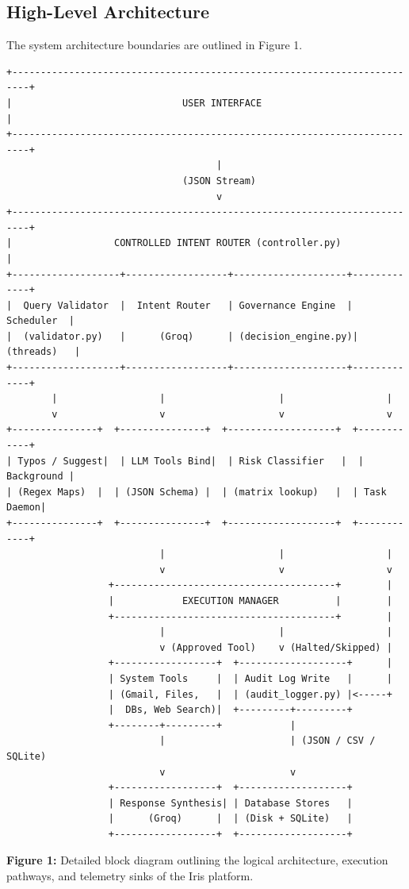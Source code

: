 \documentclass{article}
\begin{document}
\subsection{High-Level Architecture}
The system architecture boundaries are outlined in Figure 1.

\begin{verbatim}
+-------------------------------------------------------------------------+
|                              USER INTERFACE                             |
+-------------------------------------------------------------------------+
                                     |
                               (JSON Stream)
                                     v
+-------------------------------------------------------------------------+
|                  CONTROLLED INTENT ROUTER (controller.py)               |
+-------------------+------------------+--------------------+-------------+
|  Query Validator  |  Intent Router   | Governance Engine  |  Scheduler  |
|  (validator.py)   |      (Groq)      | (decision_engine.py)| (threads)   |
+-------------------+------------------+--------------------+-------------+
        |                  |                    |                  |
        v                  v                    v                  v
+---------------+  +---------------+  +-------------------+  +------------+
| Typos / Suggest|  | LLM Tools Bind|  | Risk Classifier   |  | Background |
| (Regex Maps)  |  | (JSON Schema) |  | (matrix lookup)   |  | Task Daemon|
+---------------+  +---------------+  +-------------------+  +------------+
                           |                    |                  |
                           v                    v                  v
                  +---------------------------------------+        |
                  |            EXECUTION MANAGER          |        |
                  +---------------------------------------+        |
                           |                    |                  |
                           v (Approved Tool)    v (Halted/Skipped) |
                  +------------------+  +-------------------+      |
                  | System Tools     |  | Audit Log Write   |      |
                  | (Gmail, Files,   |  | (audit_logger.py) |<-----+
                  |  DBs, Web Search)|  +---------+---------+
                  +--------+---------+            |
                           |                      | (JSON / CSV / SQLite)
                           v                      v
                  +------------------+  +-------------------+
                  | Response Synthesis| | Database Stores   |
                  |      (Groq)      |  | (Disk + SQLite)   |
                  +------------------+  +-------------------+
\end{verbatim}
\begin{center}
\small \textbf{Figure 1:} Detailed block diagram outlining the logical architecture, execution pathways, and telemetry sinks of the Iris platform.
\end{center}
\end{document}

